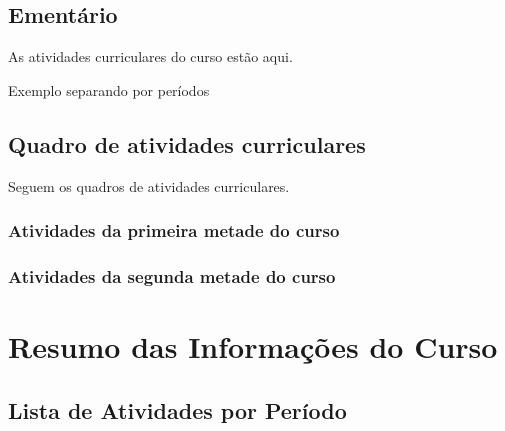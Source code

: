 \documentclass[a3]{ppc-ufscar}
\begin{document}
\ptbrsentenca[700-703]


\section{Ementário}
As atividades curriculares do curso estão aqui. \ptbrparagrafo[11-12]


Exemplo separando por períodos


\section{Quadro de atividades curriculares}
Seguem os quadros de atividades curriculares. \ptbrsentenca[66]

\begin{landscape}
    \subsection{Atividades da primeira metade do curso}


    \subsection{Atividades da segunda metade do curso}

\end{landscape}


\appendix


\chapter{Resumo das Informações do Curso}


\section{Lista de Atividades por Período}
\end{document}
